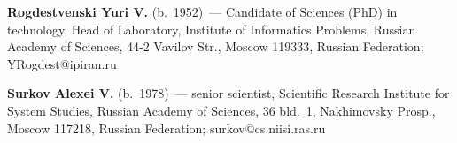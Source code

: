 \noindent
\textbf{Rogdestvenski Yuri V.} (b.\ 1952)~--- Candidate of  Sciences (PhD) in 
technology, Head of Laboratory, Institute of Informatics Problems, 
Russian Academy of Sciences, 44-2 Vavilov Str.,
Moscow 119333, Russian Federation; YRogdest@ipiran.ru

\vspace*{2pt}

\noindent
\textbf{Surkov Alexei V.} (b.\ 1978)~---  senior scientist, 
Scientific Research Institute for System Studies, Russian Academy of Sciences,
36 bld.~1, Nakhimovsky Prosp.,
Moscow 117218, Russian Federation;  surkov@cs.niisi.ras.ru


 \label{end\stat}
 
\renewcommand{\bibname}{\protect\rm Литература}